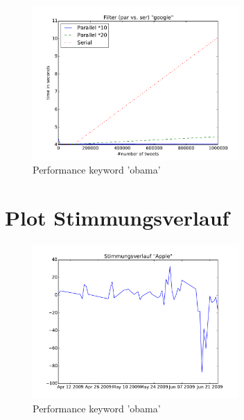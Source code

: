 \documentclass[12pt, oneside]{report}   	%
\begin{document}
\begin{figure}[h]
\begin{center}
\includegraphics[width=0.7\textwidth]{bilder/time_filter_google.pdf}
\caption{Performance keyword 'obama'}
\label{img:performancefilter3}
\end{center}
\end{figure}

\newpage{}
\section{Plot Stimmungsverlauf}

\begin{figure}[h]
\begin{center}
\includegraphics[width=0.7\textwidth]{bilder/moodPlotApple.pdf}
\caption{Performance keyword 'obama'}
\label{img:performancefilter3}
\end{center}
\end{figure}
\end{document}
